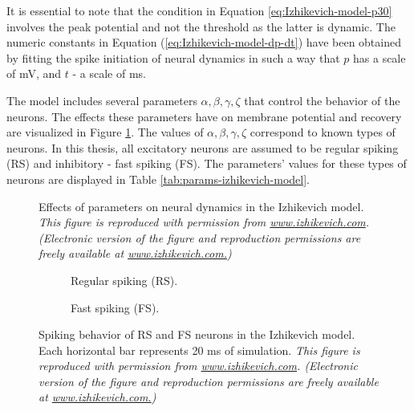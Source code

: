 It is essential to note that the condition in Equation \ref{eq:Izhikevich-model-p30} involves the peak potential and not the threshold as the latter is dynamic.
The numeric constants in Equation (\ref{eq:Izhikevich-model-dp-dt}) have been obtained by fitting the spike initiation of neural dynamics in such a way that $p$ has a scale of mV, and $t$ - a scale of ms.


The model includes several parameters $\alpha, \beta, \gamma, \zeta$ that control the behavior of the neurons. 
The effects these parameters have on membrane potential and recovery are visualized in Figure \ref{fig:neural-dynamics}. 
The values of $\alpha, \beta, \gamma, \zeta$ correspond to known types of neurons. In this thesis, all excitatory neurons are assumed to be regular spiking (RS) and inhibitory - fast spiking (FS). 
The parameters' values for these types of neurons  are displayed in Table \ref{tab:params-izhikevich-model}.

\begin{figure}[!htp]
    \centering
    
    \caption[Effects of Izhikevich parameters on neural dynamics]{Effects of parameters on neural dynamics in the Izhikevich model. {\it This figure is reproduced with permission from \url{www.izhikevich.com}. (Electronic version of the figure and reproduction permissions are freely available at \url{www.izhikevich.com.})}}
    \label{fig:neural-dynamics}
\end{figure}

\begin{figure}[!htp]
    \hspace*{-1.5cm} 
    \centering
    \begin{subfigure}[t]{0.3\textwidth}
        \centering
        
        \caption{Regular spiking (RS).}
        \label{fig:neuron-types-rs}
    \end{subfigure}
    \hspace{0.1\textwidth}
    \begin{subfigure}[t]{0.3\textwidth}
        \centering
        
        \caption{Fast spiking (FS).}
        \label{fig:neuron-types-fs}
    \end{subfigure}
    \caption[Spiking behavior of RS and FS neurons]{Spiking behavior of RS and FS neurons in the Izhikevich model. Each horizontal bar represents 20 ms of simulation. {\it This figure is reproduced with permission from \url{www.izhikevich.com}. (Electronic version of the figure and reproduction permissions are freely available at \url{www.izhikevich.com.})}}
    \label{fig:neuron-types}
\end{figure}

